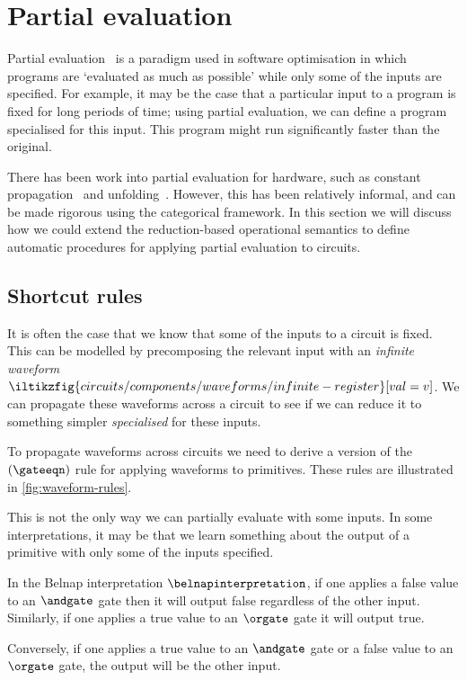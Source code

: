 \section{Partial evaluation}

Partial evaluation~\cite{jones1996introduction} is a paradigm used in software
optimisation in which programs are `evaluated as much as possible' while only
some of the inputs are specified.
For example, it may be the case that a particular input to a program is fixed
for long periods of time; using partial evaluation, we can define a program
specialised for this input.
This program might run significantly faster than the original.

There has been work into partial evaluation for hardware, such as constant
propagation~\cite{singh1996expressing,singh1999partial} and
unfolding~\cite{thompson2006bitlevel}.
However, this has been relatively informal, and can be made rigorous using the
categorical framework.
In this section we will discuss how we could extend the reduction-based
operational semantics to define automatic procedures for applying partial
evaluation to circuits.

\subsection{Shortcut rules}

It is often the case that we know that some of the inputs to a circuit is fixed.
This can be modelled by precomposing the relevant input with an
\emph{infinite waveform} \(
\iltikzfig{circuits/components/waveforms/infinite-register}[val=v]
\).
We can propagate these waveforms across a circuit to see if we can reduce it to
something simpler \emph{specialised} for these inputs.

To propagate waveforms across circuits we need to derive a version of the
\((\gateeqn)\) rule for applying waveforms to primitives.
These rules are illustrated in \cref{fig:waveform-rules}.



This is not the only way we can partially evaluate with some inputs.
In some interpretations, it may be that we learn something about the output of
a primitive with only some of the inputs specified.

\begin{example}
    In the Belnap interpretation \(\belnapinterpretation\), if one applies a
    false value to an \(\andgate\) gate then it will output false regardless of
    the other input.
    Similarly, if one applies a true value to an \(\orgate\) gate it will output
    true.

    Conversely, if one applies a true value to an \(\andgate\) gate or a false
    value to an \(\orgate\) gate, the output will be the other input.
\end{example}

